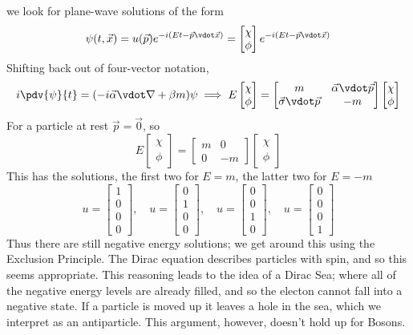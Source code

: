 we look for plane-wave solutions of the form
\[ \psi(t, \vec{x}) = u(\vec{p}) e^{-i(Et - \vec{p} \vdot \vec{x})} =
\begin{bmatrix}
  \chi \\ \phi
\end{bmatrix}
e^{-i(Et - \vec{p} \vdot \vec{x})}
\]
Shifting back out of four-vector notation,
\[ i \pdv{\psi}{t} = (-i \vec{\alpha} \vdot \nabla + \beta m) \psi \implies E
\begin{bmatrix}
  \chi \\ \phi
\end{bmatrix}
=
\begin{bmatrix}
  m & \vec{\alpha} \vdot \vec{p} \\ \vec{\sigma} \vdot \vec{p} & -m
\end{bmatrix}
\begin{bmatrix}
  \chi \\ \phi
\end{bmatrix}
\]
For a particle at rest $\vec{p}=\vec{0}$, so
\begin{equation}
  \label{eq:89}
  E \begin{bmatrix}
  \chi \\ \phi
\end{bmatrix}
=
\begin{bmatrix}
  m & 0 \\ 0 & -m
\end{bmatrix}
\begin{bmatrix}
  \chi \\ \phi
\end{bmatrix}
\end{equation}
This has the solutions, the first two for $E=m$, the latter two for $E=-m$
\[ u =
\begin{bmatrix}
  1 \\ 0 \\ 0 \\ 0
\end{bmatrix}, \quad u = \begin{bmatrix}
  0 \\ 1 \\ 0 \\ 0
\end{bmatrix}, \quad
u =
\begin{bmatrix}
  0 \\ 0 \\ 1 \\ 0
\end{bmatrix}, \quad u = \begin{bmatrix}
  0 \\ 0 \\ 0 \\ 1
\end{bmatrix}
\]
Thus there are still negative energy solutions; we get around this
using the Exclusion Principle. The Dirac equation describes particles
with spin, and so this seems appropriate. This reasoning leads to the
idea of a Dirac Sea; where all of the negative energy levels are
already filled, and so the electon cannot fall into a negative
state. If a particle is moved up it leaves a hole in the sea, which we
interpret as an antiparticle. This argument, however, doesn't hold up
for Bosons.


